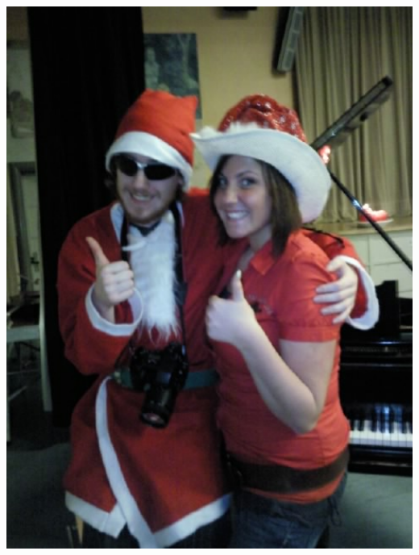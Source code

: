 \documentclass[aspectratio=169]{beamer}
\begin{document}
\begin{frame}[fragile]
\begin{minipage}{.17\textwidth}
        \includegraphics[width=1.0\textwidth]{images/0304.jpg}
    \end{minipage}
\end{frame}

\end{document}

